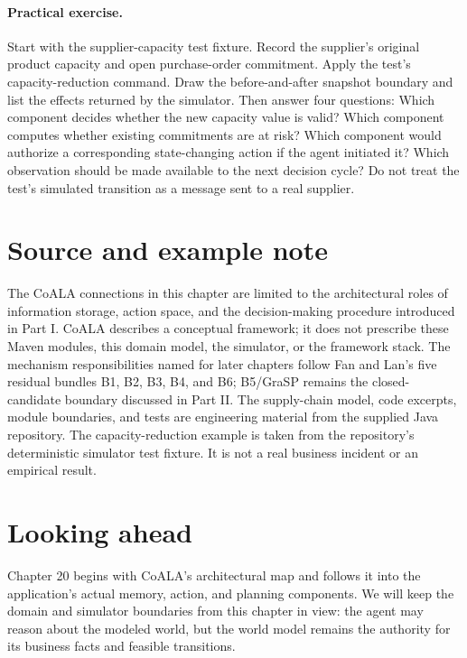 \paragraph{Practical exercise.} Start with the supplier-capacity test fixture. Record the supplier's original product capacity and open purchase-order commitment. Apply the test's capacity-reduction command. Draw the before-and-after snapshot boundary and list the effects returned by the simulator. Then answer four questions: Which component decides whether the new capacity value is valid? Which component computes whether existing commitments are at risk? Which component would authorize a corresponding state-changing action if the agent initiated it? Which observation should be made available to the next decision cycle? Do not treat the test's simulated transition as a message sent to a real supplier.

\section*{Source and example note}
The CoALA connections in this chapter are limited to the architectural roles of information storage, action space, and the decision-making procedure introduced in Part I. CoALA describes a conceptual framework; it does not prescribe these Maven modules, this domain model, the simulator, or the framework stack. The mechanism responsibilities named for later chapters follow Fan and Lan's five residual bundles B1, B2, B3, B4, and B6; B5/GraSP remains the closed-candidate boundary discussed in Part II. The supply-chain model, code excerpts, module boundaries, and tests are engineering material from the supplied Java repository. The capacity-reduction example is taken from the repository's deterministic simulator test fixture. It is not a real business incident or an empirical result.


\section*{Looking ahead}
Chapter 20 begins with CoALA's architectural map and follows it into the application's actual memory, action, and planning components. We will keep the domain and simulator boundaries from this chapter in view: the agent may reason about the modeled world, but the world model remains the authority for its business facts and feasible transitions.
